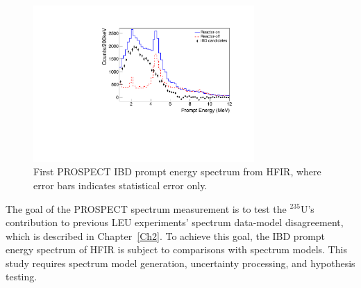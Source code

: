 \begin{figure}[h!]
    \centering
    \includegraphics[width=0.75\textwidth]{Figures/h1IBDESpectrum.pdf}
    \caption[First PROSPECT IBD prompt energy spectrum from HFIR]{First PROSPECT IBD prompt energy spectrum from HFIR, where error bars indicates statistical error only.
    }
    \label{fig:IBDspectrum}
\end{figure}


The goal of the PROSPECT spectrum measurement is to test the $^{235}$U's contribution to previous LEU experiments' spectrum data-model disagreement, which is described in Chapter~\ref{Ch2}.
To achieve this goal, the IBD prompt energy spectrum of HFIR is subject to comparisons with spectrum models.
This study requires spectrum model generation, uncertainty processing, and hypothesis testing.

